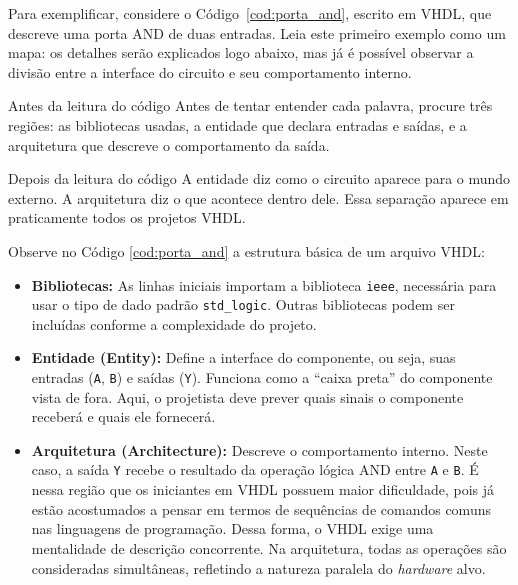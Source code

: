 Para exemplificar, considere o Código~\ref{cod:porta_and}, escrito em VHDL, que descreve uma porta AND de duas entradas. Leia este primeiro exemplo como um mapa: os detalhes serão explicados logo abaixo, mas já é possível observar a divisão entre a interface do circuito e seu comportamento interno.

\begin{observacao}{Antes da leitura do código}
Antes de tentar entender cada palavra, procure três regiões: as bibliotecas usadas, a entidade que declara entradas e saídas, e a arquitetura que descreve o comportamento da saída.
\end{observacao}



\begin{observacao}{Depois da leitura do código}
A entidade diz como o circuito aparece para o mundo externo. A arquitetura diz o que acontece dentro dele. Essa separação aparece em praticamente todos os projetos VHDL.
\end{observacao}

Observe no Código \ref{cod:porta_and} a estrutura básica de um arquivo VHDL:

\begin{itemize}
    \item \textbf{Bibliotecas:} As linhas iniciais importam a biblioteca \texttt{ieee}, necessária para usar o tipo de dado padrão \texttt{std\_logic}. Outras bibliotecas podem ser incluídas conforme a complexidade do projeto.
    \item \textbf{Entidade (Entity):} Define a interface do componente, ou seja, suas entradas (\texttt{A}, \texttt{B}) e saídas (\texttt{Y}). Funciona como a ``caixa preta'' do componente vista de fora. Aqui, o projetista deve prever quais sinais o componente receberá e quais ele fornecerá.
    \item \textbf{Arquitetura (Architecture):} Descreve o comportamento interno. Neste caso, a saída \texttt{Y} recebe o resultado da operação lógica AND entre \texttt{A} e \texttt{B}. É nessa região que os iniciantes em VHDL possuem maior dificuldade, pois já estão acostumados a pensar em termos de sequências de comandos comuns nas linguagens de programação. Dessa forma, o VHDL exige uma mentalidade de descrição concorrente. Na arquitetura, todas as operações são consideradas simultâneas, refletindo a natureza paralela do \textit{hardware} alvo.
\end{itemize}

